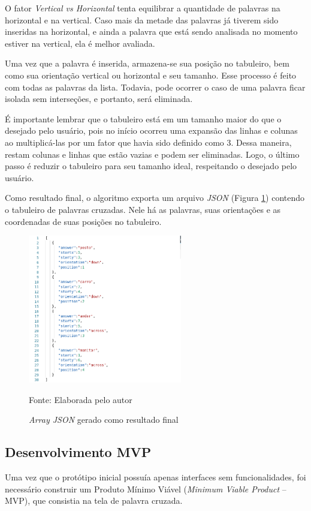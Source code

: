 O fator \textit{Vertical vs Horizontal} tenta equilibrar a quantidade de palavras na horizontal e na vertical. Caso mais da metade das palavras já tiverem sido inseridas na horizontal, e ainda a palavra que está sendo analisada no momento estiver na vertical, ela é melhor avaliada.

Uma vez que a palavra é inserida, armazena-se sua posição no tabuleiro, bem como sua orientação vertical ou horizontal e seu tamanho. Esse processo é feito com todas as palavras da lista. Todavia, pode ocorrer o caso de uma palavra ficar isolada sem interseções, e portanto, será eliminada. 

É importante lembrar que o tabuleiro está em um tamanho maior do que o desejado pelo usuário, pois no início ocorreu uma expansão das linhas e colunas ao multiplicá-las por um fator que havia sido definido como 3. Dessa maneira, restam colunas e linhas que estão vazias e podem ser eliminadas. Logo, o último passo é reduzir o tabuleiro para seu tamanho ideal, respeitando o desejado pelo usuário. 

Como resultado final, o algoritmo exporta um arquivo \textit{JSON} (Figura \ref{fig:json}) contendo o tabuleiro de palavras cruzadas. Nele há as palavras, suas orientações e as coordenadas de suas posições no tabuleiro.

\begin{figure}[H]
\centering
    \caption{\textit{Array JSON} gerado como resultado final}
    \label{fig:json}
    \includegraphics[width=0.6\textwidth]{Figuras/codeJSONresult.png}
    
    Fonte: Elaborada pelo autor
\end{figure}

\subsection{Desenvolvimento MVP}
Uma vez que o protótipo inicial possuía apenas interfaces sem funcionalidades, foi necessário construir um Produto Mínimo Viável (\textit{Minimum Viable Product} -- MVP), que consistia na tela de palavra cruzada.

